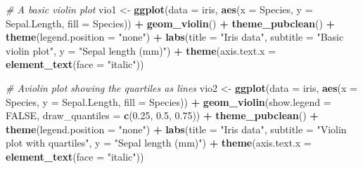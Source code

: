\documentclass[english,10pt,a4paper,oneside]{book}
\newenvironment{Shaded}{\begin{snugshade}}{\end{snugshade}}
\newcommand{\CommentTok}[1]{\textcolor[rgb]{0.56,0.35,0.01}{\textit{#1}}}
\newcommand{\DataTypeTok}[1]{\textcolor[rgb]{0.13,0.29,0.53}{#1}}
\newcommand{\FloatTok}[1]{\textcolor[rgb]{0.00,0.00,0.81}{#1}}
\newcommand{\KeywordTok}[1]{\textcolor[rgb]{0.13,0.29,0.53}{\textbf{#1}}}
\newcommand{\NormalTok}[1]{#1}
\newcommand{\OperatorTok}[1]{\textcolor[rgb]{0.81,0.36,0.00}{\textbf{#1}}}
\newcommand{\OtherTok}[1]{\textcolor[rgb]{0.56,0.35,0.01}{#1}}
\newcommand{\StringTok}[1]{\textcolor[rgb]{0.31,0.60,0.02}{#1}}
\theoremstyle{definition}
\theoremstyle{definition}
\theoremstyle{definition}
\theoremstyle{remark}
\begin{document}
\begin{Shaded}
\begin{Highlighting}[]
\CommentTok{# A basic violin plot}
\NormalTok{vio1 <-}\StringTok{ }\KeywordTok{ggplot}\NormalTok{(}\DataTypeTok{data =}\NormalTok{ iris, }\KeywordTok{aes}\NormalTok{(}\DataTypeTok{x =}\NormalTok{ Species, }\DataTypeTok{y =}\NormalTok{ Sepal.Length, }\DataTypeTok{fill =}\NormalTok{ Species)) }\OperatorTok{+}
\StringTok{  }\KeywordTok{geom_violin}\NormalTok{() }\OperatorTok{+}\StringTok{ }
\StringTok{  }\KeywordTok{theme_pubclean}\NormalTok{() }\OperatorTok{+}\StringTok{ }\KeywordTok{theme}\NormalTok{(}\DataTypeTok{legend.position =} \StringTok{"none"}\NormalTok{) }\OperatorTok{+}
\StringTok{  }\KeywordTok{labs}\NormalTok{(}\DataTypeTok{title =} \StringTok{"Iris data"}\NormalTok{,}
       \DataTypeTok{subtitle =} \StringTok{"Basic violin plot"}\NormalTok{, }\DataTypeTok{y =} \StringTok{"Sepal length (mm)"}\NormalTok{) }\OperatorTok{+}
\StringTok{  }\KeywordTok{theme}\NormalTok{(}\DataTypeTok{axis.text.x =} \KeywordTok{element_text}\NormalTok{(}\DataTypeTok{face =} \StringTok{"italic"}\NormalTok{))}

\CommentTok{# Aviolin plot showing the quartiles as lines}
\NormalTok{vio2 <-}\StringTok{ }\KeywordTok{ggplot}\NormalTok{(}\DataTypeTok{data =}\NormalTok{ iris, }\KeywordTok{aes}\NormalTok{(}\DataTypeTok{x =}\NormalTok{ Species, }\DataTypeTok{y =}\NormalTok{ Sepal.Length, }\DataTypeTok{fill =}\NormalTok{ Species)) }\OperatorTok{+}
\StringTok{  }\KeywordTok{geom_violin}\NormalTok{(}\DataTypeTok{show.legend =} \OtherTok{FALSE}\NormalTok{, }\DataTypeTok{draw_quantiles =} \KeywordTok{c}\NormalTok{(}\FloatTok{0.25}\NormalTok{, }\FloatTok{0.5}\NormalTok{, }\FloatTok{0.75}\NormalTok{)) }\OperatorTok{+}\StringTok{ }
\StringTok{  }\KeywordTok{theme_pubclean}\NormalTok{() }\OperatorTok{+}\StringTok{ }\KeywordTok{theme}\NormalTok{(}\DataTypeTok{legend.position =} \StringTok{"none"}\NormalTok{) }\OperatorTok{+}
\StringTok{  }\KeywordTok{labs}\NormalTok{(}\DataTypeTok{title =} \StringTok{"Iris data"}\NormalTok{,}
       \DataTypeTok{subtitle =} \StringTok{"Violin plot with quartiles"}\NormalTok{, }\DataTypeTok{y =} \StringTok{"Sepal length (mm)"}\NormalTok{) }\OperatorTok{+}
\StringTok{  }\KeywordTok{theme}\NormalTok{(}\DataTypeTok{axis.text.x =} \KeywordTok{element_text}\NormalTok{(}\DataTypeTok{face =} \StringTok{"italic"}\NormalTok{))}


\end{Highlighting}
\end{Shaded}
\end{document}
